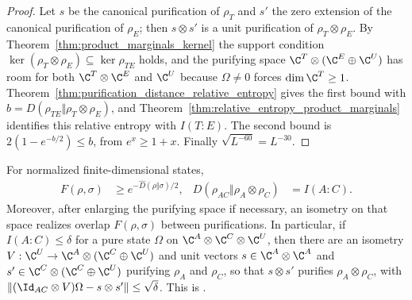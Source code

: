 \begin{proof}\leanok
    Let $s$ be the canonical purification of $\rho_T$ and $s'$ the zero
    extension of the canonical purification of $\rho_E$; then $s\otimes s'$
    is a unit purification of $\rho_T\otimes\rho_E$. By
    Theorem~\ref{thm:product_marginals_kernel} the support condition
    $\ker(\rho_T\otimes\rho_E)\subseteq\ker\rho_{TE}$ holds, and the
    purifying space $\C^T\otimes(\C^E\oplus\C^U)$ has room for both
    $\C^T\otimes\C^E$ and $\C^U$ because $\Omega\ne0$ forces
    $\dim\C^T\ge1$. Theorem~\ref{thm:purification_distance_relative_entropy}
    gives the first bound with $b=D(\rho_{TE}\Vert\rho_T\otimes\rho_E)$,
    and Theorem~\ref{thm:relative_entropy_product_marginals} identifies
    this relative entropy with $I(T{:}E)$. The second bound is
    $2(1-e^{-b/2})\le b$, from $e^x\ge1+x$. Finally
    $\sqrt{L^{-60}}=L^{-30}$.
\end{proof}

\begin{theorem}
    \label{thm:fidelity_purification}
    \leanok
    For normalized finite-dimensional states,
    \begin{align}
        F(\rho,\sigma)
         & \ge e^{-\widehat D(\rho\Vert\sigma)/2},
         &
        D(\rho_{AC}\Vert\rho_A\otimes\rho_C)
         & =I(A{:}C).
        \label{eq:fidelity_information}
    \end{align}
    Moreover, after enlarging the purifying space if necessary, an
    isometry on that space realizes overlap $F(\rho,\sigma)$ between
    purifications. In particular, if $I(A{:}C)\le\delta$ for a pure state
    $\Omega$ on $\C^A\otimes\C^C\otimes\C^U$, then there are an isometry
    $V:\C^U\to\C^A\otimes(\C^C\oplus\C^U)$ and unit vectors
    $s\in\C^A\otimes\C^A$ and $s'\in\C^C\otimes(\C^C\oplus\C^U)$
    purifying $\rho_A$ and $\rho_C$, so that $s\otimes s'$ purifies
    $\rho_A\otimes\rho_C$, with
    $\lVert(\Id_{AC}\otimes V)\Omega-s\otimes s'\rVert\le\sqrt\delta$.
    This is \cite[Lemma~2.2]{OpenAI2026PolynomialPEPS}.
\end{theorem}

